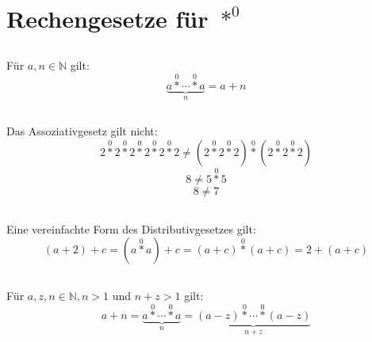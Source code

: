 \documentclass{article}
\begin{document}
\section{Rechengesetze f\"ur $\operatorname*{\ast}^0$\newline}

\subsection{}
F\"ur $a, n \in \mathbb{N}$ gilt:
\[ \underbrace{a \operatorname*{\ast}^0 \dotsb \operatorname*{\ast}^0 a}_n = a+n \]
\subsection{}
	Das Assoziativgesetz gilt nicht:
\[ 2 \operatorname*{\ast}^0 2 \operatorname*{\ast}^0 2 \operatorname*{\ast}^0 2 \operatorname*{\ast}^0 2 \operatorname*{\ast}^0 2 \neq
   \left(2 \operatorname*{\ast}^0 2 \operatorname*{\ast}^0 2\right) \operatorname*{\ast}^0 \left(2 \operatorname*{\ast}^0 2 \operatorname*{\ast}^0 2\right) \]
\[ 8 \neq 5 \operatorname*{\ast}^0 5 \]
\[ 8 \neq 7 \]
\subsection{}
	Eine vereinfachte Form des Distributivgesetzes gilt:
\[ \left(a + 2\right) + c = \left(a\operatorname*{\ast}^0a\right) + c = \left(a+c\right)\operatorname*{\ast}^0\left(a+c\right) = 2 + \left(a + c\right) \]
\subsection{}
F\"ur $a, z, n \in \mathbb{N}, n > 1$ und $n+z > 1$ gilt:
\[ a + n = \underbrace{a \operatorname*{\ast}^0 \dotsb \operatorname*{\ast}^0 a}_n =
   \underbrace{\left(a - z\right) \operatorname*{\ast}^0 \dotsb \operatorname*{\ast}^0 \left(a - z\right)}_{n+z} \]
\end{document}
